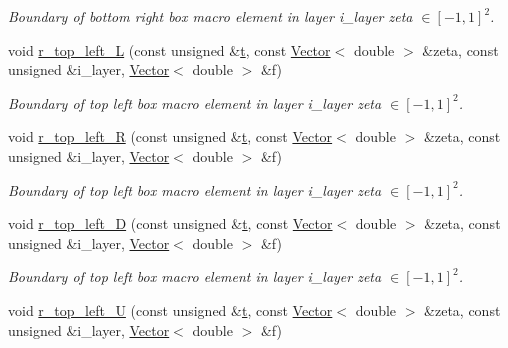\begin{DoxyCompactItemize}
\begin{DoxyCompactList}\small\item\em Boundary of bottom right box macro element in layer i\+\_\+layer zeta $ \in [-1,1]^2 $. \end{DoxyCompactList}\item 
void \hyperlink{classoomph_1_1QuarterTubeDomain_a17a846a90e283ec86538f17145ad7923}{r\+\_\+top\+\_\+left\+\_\+L} (const unsigned \&\hyperlink{cfortran_8h_af6f0bd3dc13317f895c91323c25c2b8f}{t}, const \hyperlink{classoomph_1_1Vector}{Vector}$<$ double $>$ \&zeta, const unsigned \&i\+\_\+layer, \hyperlink{classoomph_1_1Vector}{Vector}$<$ double $>$ \&f)
\begin{DoxyCompactList}\small\item\em Boundary of top left box macro element in layer i\+\_\+layer zeta $ \in [-1,1]^2 $. \end{DoxyCompactList}\item 
void \hyperlink{classoomph_1_1QuarterTubeDomain_a1aded600b61798fbc080189fadd1c603}{r\+\_\+top\+\_\+left\+\_\+R} (const unsigned \&\hyperlink{cfortran_8h_af6f0bd3dc13317f895c91323c25c2b8f}{t}, const \hyperlink{classoomph_1_1Vector}{Vector}$<$ double $>$ \&zeta, const unsigned \&i\+\_\+layer, \hyperlink{classoomph_1_1Vector}{Vector}$<$ double $>$ \&f)
\begin{DoxyCompactList}\small\item\em Boundary of top left box macro element in layer i\+\_\+layer zeta $ \in [-1,1]^2 $. \end{DoxyCompactList}\item 
void \hyperlink{classoomph_1_1QuarterTubeDomain_a07e5e6c5549b5cda5adbc91c8c9fdcbb}{r\+\_\+top\+\_\+left\+\_\+D} (const unsigned \&\hyperlink{cfortran_8h_af6f0bd3dc13317f895c91323c25c2b8f}{t}, const \hyperlink{classoomph_1_1Vector}{Vector}$<$ double $>$ \&zeta, const unsigned \&i\+\_\+layer, \hyperlink{classoomph_1_1Vector}{Vector}$<$ double $>$ \&f)
\begin{DoxyCompactList}\small\item\em Boundary of top left box macro element in layer i\+\_\+layer zeta $ \in [-1,1]^2 $. \end{DoxyCompactList}\item 
void \hyperlink{classoomph_1_1QuarterTubeDomain_ac1cda2361ed175bdf52032dce05f4365}{r\+\_\+top\+\_\+left\+\_\+U} (const unsigned \&\hyperlink{cfortran_8h_af6f0bd3dc13317f895c91323c25c2b8f}{t}, const \hyperlink{classoomph_1_1Vector}{Vector}$<$ double $>$ \&zeta, const unsigned \&i\+\_\+layer, \hyperlink{classoomph_1_1Vector}{Vector}$<$ double $>$ \&f)

\end{DoxyCompactItemize}
